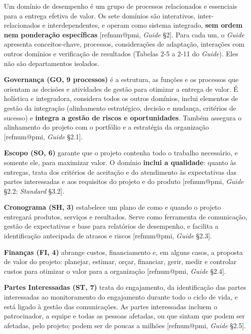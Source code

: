 \documentclass[12pt,a4paper,article,oneside,english,brazil]{abntex2}
\makeatletter
\newcommand{\refnum}[1]{\csname refnum@#1\endcsname}
\makeatother
\begin{document}
Um domínio de desempenho é um grupo de processos relacionados e essenciais para a entrega efetiva de valor. Os sete domínios são interativos, inter-relacionados e interdependentes, e operam como sistema integrado, \textbf{sem ordem nem ponderação específicas} [\refnum{pmi}, \textit{Guide} §2]. Para cada um, o \textit{Guide} apresenta conceitos-chave, processos, considerações de adaptação, interações com outros domínios e verificação de resultados (Tabelas 2-5 a 2-11 do \textit{Guide}). Eles não são departamentos isolados.

\textbf{Governança (GO, 9 processos)} é a estrutura, as funções e os processos que orientam as decisões e atividades de gestão para otimizar a entrega de valor. É holística e integradora, considera todos os outros domínios, inclui elementos de gestão da integração (alinhamento estratégico, decisão e mudança, critérios de sucesso) e \textbf{integra a gestão de riscos e oportunidades}. Também assegura o alinhamento do projeto com o portfólio e a estratégia da organização [\refnum{pmi}, \textit{Guide} §2.1].

\textbf{Escopo (SO, 6)} garante que o projeto contenha todo o trabalho necessário, e somente ele, para maximizar valor. O domínio \textbf{inclui a qualidade}: quanto às entregas, trata dos critérios de aceitação e do atendimento às expectativas das partes interessadas e aos requisitos do projeto e do produto [\refnum{pmi}, \textit{Guide} §2.2; \textit{Standard} §3.2].

\textbf{Cronograma (SH, 3)} estabelece um plano de como e quando o projeto entregará produtos, serviços e resultados. Serve como ferramenta de comunicação, gestão de expectativas e base para relatórios de desempenho, e facilita a identificação antecipada de atrasos e riscos [\refnum{pmi}, \textit{Guide} §2.3].

\textbf{Finanças (FI, 4)} abrange custos, financiamento e, em alguns casos, a proposta de valor do projeto: planejar, estimar, orçar, financiar, gerir, medir e controlar custos para otimizar o valor para a organização [\refnum{pmi}, \textit{Guide} §2.4].

\textbf{Partes Interessadas (ST, 7)} trata do engajamento, da identificação das partes interessadas ao monitoramento do engajamento durante todo o ciclo de vida, e está ligado à gestão das comunicações. As partes interessadas incluem o patrocinador, a equipe e todas as pessoas afetadas, ou que sintam que podem ser afetadas, pelo projeto; podem ser de poucas a milhões [\refnum{pmi}, \textit{Guide} §2.5].
\end{document}
